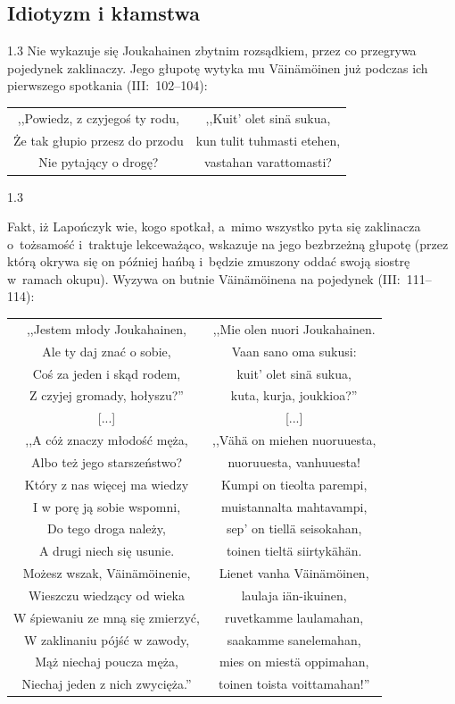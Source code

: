 \documentclass[11pt,a4paper,twoside]{report}
\begin{document}
\vspace*{0.5\baselineskip}
\subsection*{Idiotyzm i kłamstwa}
\begin{spacing}{1.3}
Nie wykazuje się Joukahainen zbytnim rozsądkiem, przez co przegrywa pojedynek zaklinaczy. Jego głupotę wytyka mu Väinämöinen już podczas ich pierwszego spotkania (III:~102--104):
\end{spacing}
{\centering
\small
\begin{longtable}{c c}
,,Powiedz, z czyjegoś ty rodu, & ,,Kuit' olet sinä sukua, \\
Że tak głupio przesz do przodu & kun tulit tuhmasti etehen, \\
Nie pytający o drogę? &  vastahan varattomasti? \\
\end{longtable}
}
\begin{spacing}{1.3}

Fakt, iż Lapończyk wie, kogo spotkał, a~mimo wszystko pyta się zaklinacza o~tożsamość i~traktuje lekceważąco, wskazuje na jego bezbrzeżną głupotę (przez którą okrywa się on później hańbą i~będzie zmuszony oddać swoją siostrę w~ramach okupu). Wyzywa on butnie Väinämöinena na pojedynek (III:~111--114):
\end{spacing}
{\centering
\small
\begin{longtable}{c c}
,,Jestem młody Joukahainen, & ,,Mie olen nuori Joukahainen. \\
Ale ty daj znać o sobie, & Vaan sano oma sukusi: \\
Coś za jeden i skąd rodem, & kuit' olet sinä sukua, \\
Z czyjej gromady, hołyszu?'' & kuta, kurja, joukkioa?'' \\
{[...]} & {[...]} \\
,,A cóż znaczy młodość męża, & ,,Vähä on miehen nuoruuesta, \\
Albo też jego starszeństwo? & nuoruuesta, vanhuuesta! \\
Który z nas więcej ma wiedzy & Kumpi on tieolta parempi, \\
I w porę ją sobie wspomni, & muistannalta mahtavampi, \\
Do tego droga należy, & sep' on tiellä seisokahan, \\
A drugi niech się usunie. & toinen tieltä siirtykähän. \\
Możesz wszak, Väinämöinenie, & Lienet vanha Väinämöinen, \\
Wieszczu wiedzący od wieka & laulaja iän-ikuinen, \\
W śpiewaniu ze mną się zmierzyć, & ruvetkamme laulamahan, \\
W zaklinaniu pójść w zawody, & saakamme sanelemahan, \\
Mąż niechaj poucza męża, & mies on miestä oppimahan, \\
Niechaj jeden z nich zwycięża.'' & toinen toista voittamahan!'' \\
\end{longtable}
}
\end{document}
